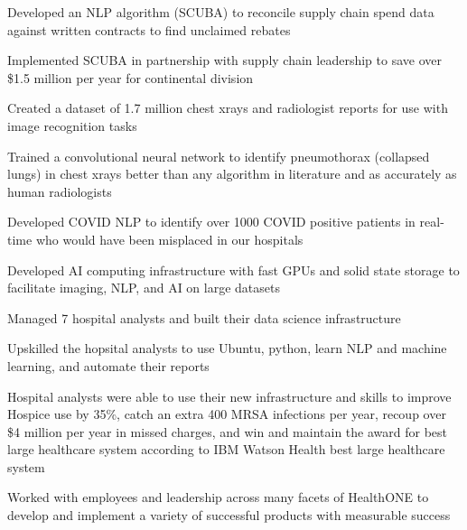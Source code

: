 \begin{resume}
\begin{stuff}
                \item Developed an NLP algorithm (SCUBA) to reconcile supply chain spend data against written contracts to find unclaimed rebates
                \item Implemented SCUBA in partnership with supply chain leadership to save over \$1.5 million per year for continental division
                \item Created a dataset of 1.7 million chest xrays and radiologist reports for use with image recognition tasks
                \item Trained a convolutional neural network to identify pneumothorax (collapsed lungs) in chest xrays better than any algorithm in literature and as accurately as human radiologists
                \item Developed COVID NLP to identify over 1000 COVID positive patients in real-time who would have been misplaced in our hospitals
                \item Developed AI computing infrastructure with fast GPUs and solid state storage to facilitate imaging, NLP, and AI on large datasets
                \item Managed 7 hospital analysts and built their data science infrastructure 
                \item Upskilled the hopsital analysts to use Ubuntu, python, learn NLP and machine learning, and automate their reports
                \item Hospital analysts were able to use their new infrastructure and skills to improve Hospice use by 35\%, catch an extra 400 MRSA infections per year, recoup over \$4 million per year in missed charges, and win and maintain the award for best large healthcare system according to IBM Watson Health best large healthcare system 
               \item Worked with employees and leadership across many facets of HealthONE to develop and implement a variety of successful products with measurable success
    \end{stuff}


\end{resume}
